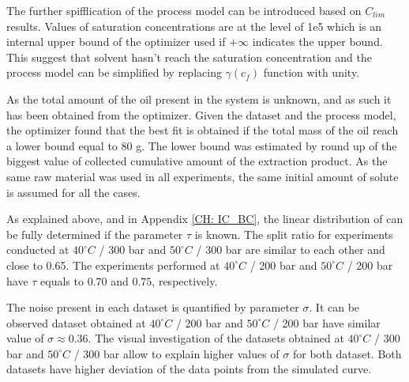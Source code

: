 \documentclass[../Article_Model_Parameters.tex]{subfiles}
\begin{document}
	The further spifflication of the process model can be introduced based on $C_{lim}$ results. Values of saturation concentrations are at the level of 1e5 which is an internal upper bound of the optimizer used if $+\infty$ indicates the upper bound. This suggest that solvent hasn't reach the saturation concentration and the process model can be simplified by replacing $\gamma(c_f)$ function with unity.
	
	As the total amount of the oil present in the system is unknown, and as such it has been obtained from the optimizer. Given the dataset and the process model, the optimizer found that the best fit is obtained if the total mass of the oil reach a lower bound equal to 80 g. The lower bound was estimated by round up of the biggest value of collected cumulative amount of the extraction product. As the same raw material was used in all experiments, the same initial amount of solute is assumed for all the cases.
	
	As explained above, and in Appendix \ref{CH: IC_BC}, the linear distribution of can be fully determined if the parameter $\tau$ is known. The split ratio for experiments conducted at $40 ^\circ C$ / 300 bar and $50 ^\circ C$ / 300 bar are similar to each other and close to 0.65. The experiments performed at $40 ^\circ C$ / 200 bar and $50 ^\circ C$ / 200 bar have $\tau$ equals to $0.70$ and $0.75$, respectively. 
	
	The noise present in each dataset is quantified by parameter $\sigma$. It can be observed dataset obtained at $40 ^\circ C$ / 200 bar and $50 ^\circ C$ / 200 bar have similar value of $\sigma\approx0.36$. The visual investigation of the datasets obtained at $40 ^\circ C$ / 300 bar and $50 ^\circ C$ / 300 bar allow to explain higher values of $\sigma$ for both dataset. Both datasets have higher deviation of the data points from the simulated curve.
	
\end{document}
